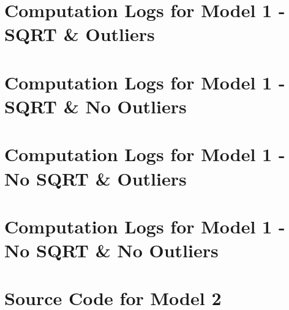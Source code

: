 \begin{landscape}

    \newpage
    \section{Computation Logs for Model 1 - SQRT \& Outliers}
    

    \newpage
    \section{Computation Logs for Model 1 - SQRT \& No Outliers}
    

    \newpage
    \section{Computation Logs for Model 1 - No SQRT \& Outliers}
    

    \newpage
    \section{Computation Logs for Model 1 - No SQRT \& No Outliers}
    

\end{landscape}


\newpage
\section{Source Code for Model 2}


